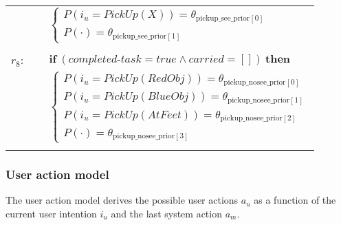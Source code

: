\begin{footnotesize}
\begin{longtable}{p{2cm}l}
 & \;\;\;\;\; $ \begin{cases}P(\mathit{i_u}\!=\!\mathit{PickUp(X)})\!=\!\theta_{\mathrm{pickup\_see\_prior[0]}} \\
P(\cdot)\!=\!\theta_{\mathrm{pickup\_see\_prior[1]}} \end{cases}$ \\ \\[-2mm]
$r_{8}$: \ \ & $ \textbf{if} \ (\mathit{completed\mbox{-}task}\!=\!\mathit{true} \land \mathit{carried}\!=\!\mathit{[]}) \ \textbf{then} $ \\
 & \;\;\;\;\; $ \begin{cases}P(\mathit{i_u}\!=\!\mathit{PickUp(RedObj)})\!=\!\theta_{\mathrm{pickup\_nosee\_prior[0]}} \\
P(\mathit{i_u}\!=\!\mathit{PickUp(BlueObj)})\!=\!\theta_{\mathrm{pickup\_nosee\_prior[1]}} \\
P(\mathit{i_u}\!=\!\mathit{PickUp(AtFeet)})\!=\!\theta_{\mathrm{pickup\_nosee\_prior[2]}} \\
P(\cdot)\!=\!\theta_{\mathrm{pickup\_nosee\_prior[3]}} \end{cases}$ \\ \\[-2mm]
\end{longtable}
\end{footnotesize}

\subsubsection*{User action model}

The user action model derives the possible user actions $a_u$ as a function of the current user intention $i_u$ and the last system action $a_m$. 

